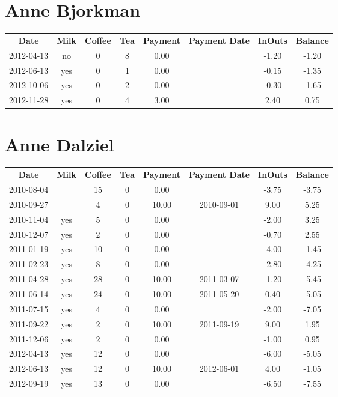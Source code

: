 \section{Anne Bjorkman}

\begin{center}
\begin{tabular}{cccccccc}
\textbf{Date} & \textbf{Milk} & \textbf{Coffee} & \textbf{Tea} & \textbf{Payment} & \textbf{Payment Date} & \textbf{InOuts} & \textbf{Balance} \\
2012-04-13 & no & 0 & 8 & 0.00 &  & -1.20 & -1.20\\ 
2012-06-13 & yes & 0 & 1 & 0.00 &  & -0.15 & -1.35\\ 
2012-10-06 & yes & 0 & 2 & 0.00 &  & -0.30 & -1.65\\ 
2012-11-28 & yes & 0 & 4 & 3.00 &  &  2.40 &  0.75
\end{tabular}
\end{center}

\section{Anne Dalziel}

\begin{center}
\begin{tabular}{cccccccc}
\textbf{Date} & \textbf{Milk} & \textbf{Coffee} & \textbf{Tea} & \textbf{Payment} & \textbf{Payment Date} & \textbf{InOuts} & \textbf{Balance} \\
2010-08-04 &  & 15 & 0 &  0.00 &  & -3.75 & -3.75\\ 
2010-09-27 &  &  4 & 0 & 10.00 & 2010-09-01 &  9.00 &  5.25\\ 
2010-11-04 & yes &  5 & 0 &  0.00 &  & -2.00 &  3.25\\ 
2010-12-07 & yes &  2 & 0 &  0.00 &  & -0.70 &  2.55\\ 
2011-01-19 & yes & 10 & 0 &  0.00 &  & -4.00 & -1.45\\ 
2011-02-23 & yes &  8 & 0 &  0.00 &  & -2.80 & -4.25\\ 
2011-04-28 & yes & 28 & 0 & 10.00 & 2011-03-07 & -1.20 & -5.45\\ 
2011-06-14 & yes & 24 & 0 & 10.00 & 2011-05-20 &  0.40 & -5.05\\ 
2011-07-15 & yes &  4 & 0 &  0.00 &  & -2.00 & -7.05\\ 
2011-09-22 & yes &  2 & 0 & 10.00 & 2011-09-19 &  9.00 &  1.95\\ 
2011-12-06 & yes &  2 & 0 &  0.00 &  & -1.00 &  0.95\\ 
2012-04-13 & yes & 12 & 0 &  0.00 &  & -6.00 & -5.05\\ 
2012-06-13 & yes & 12 & 0 & 10.00 & 2012-06-01 &  4.00 & -1.05\\ 
2012-09-19 & yes & 13 & 0 &  0.00 &  & -6.50 & -7.55
\end{tabular}
\end{center}

